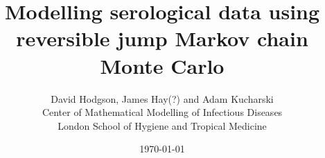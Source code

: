 \documentclass{article}
\title{Modelling serological data using reversible jump Markov chain Monte Carlo}
\author{David Hodgson, James Hay(?) and Adam Kucharski\\\small Center of Mathematical Modelling of Infectious Diseases\\\small London School of Hygiene and Tropical Medicine}
\date{\today}
\begin{document}
\maketitle


\newpage

\newpage

\newpage

\newpage

 
\newpage
\begin{appendices}





\end{appendices}
\end{document}
